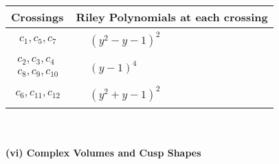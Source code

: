 \documentclass[1p]{elsarticle_modified}
\theoremstyle{definition}
\begin{document}
\begin{tabular}{m{50pt}|m{274pt}}
Crossings & \hspace{64pt}Riley Polynomials at each crossing \\
\hline $$\begin{aligned}c_{1},c_{5},c_{7}\end{aligned}$$&$\begin{aligned}
&(y^2- y-1)^2
\end{aligned}$\\
\hline $$\begin{aligned}c_{2},c_{3},c_{4}\\c_{8},c_{9},c_{10}\end{aligned}$$&$\begin{aligned}
&(y-1)^4
\end{aligned}$\\
\hline $$\begin{aligned}c_{6},c_{11},c_{12}\end{aligned}$$&$\begin{aligned}
&(y^2+y-1)^2
\end{aligned}$\\
\hline
\end{tabular}\\~\\
\newpage\flushleft \textbf{(vi) Complex Volumes and Cusp Shapes}
\end{document}
